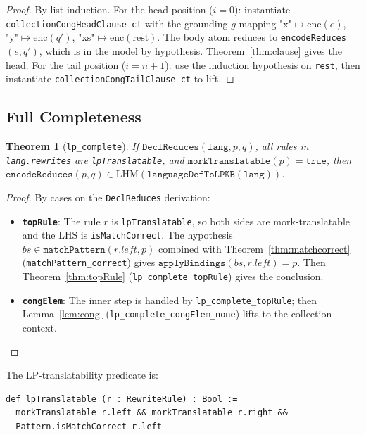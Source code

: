 \documentclass[]{article}
\newtheorem{theorem}{Theorem}
\newcommand{\code}[1]{\texttt{#1}}
\begin{document}
\begin{proof}
By list induction.  For the head position ($i = 0$): instantiate
\code{collectionCongHeadClause ct} with the grounding $g$ mapping
$\text{"x"} \mapsto \text{enc}(e)$, $\text{"y"} \mapsto \text{enc}(q')$,
$\text{"xs"} \mapsto \text{enc}(\text{rest})$.  The body atom reduces to
\code{encodeReduces}$(e, q')$, which is in the model by hypothesis.
Theorem~\ref{thm:clause} gives the head.  For the tail position ($i = n+1$):
use the induction hypothesis on \code{rest}, then instantiate
\code{collectionCongTailClause ct} to lift.
\end{proof}

\subsection{Full Completeness}

\begin{theorem}[\code{lp\_complete}]
\label{thm:complete}
If $\code{DeclReduces}(\code{lang}, p, q)$,
all rules in \code{lang.rewrites} are \code{lpTranslatable},
and $\code{morkTranslatable}(p) = \code{true}$,
then $\code{encodeReduces}(p, q) \in \mathrm{LHM}(\code{languageDefToLPKB}(\code{lang}))$.
\end{theorem}

\begin{proof}
By cases on the \code{DeclReduces} derivation:
\begin{itemize}
\item \textbf{\code{topRule}}: The rule $r$ is \code{lpTranslatable}, so both sides are
  mork-translatable and the LHS is \code{isMatchCorrect}.  The hypothesis
  $bs \in \code{matchPattern}(r.left, p)$ combined with
  Theorem~\ref{thm:matchcorrect} (\code{matchPattern\_correct}) gives
  $\code{applyBindings}(bs, r.left) = p$.  Then Theorem~\ref{thm:topRule}
  (\code{lp\_complete\_topRule}) gives the conclusion.
\item \textbf{\code{congElem}}: The inner step is handled by \code{lp\_complete\_topRule};
  then Lemma~\ref{lem:cong} (\code{lp\_complete\_congElem\_none}) lifts to the
  collection context.
\end{itemize}
\end{proof}

The LP-translatability predicate is:
\begin{lstlisting}[language=lean]
def lpTranslatable (r : RewriteRule) : Bool :=
  morkTranslatable r.left && morkTranslatable r.right &&
  Pattern.isMatchCorrect r.left
\end{lstlisting}
\end{document}
